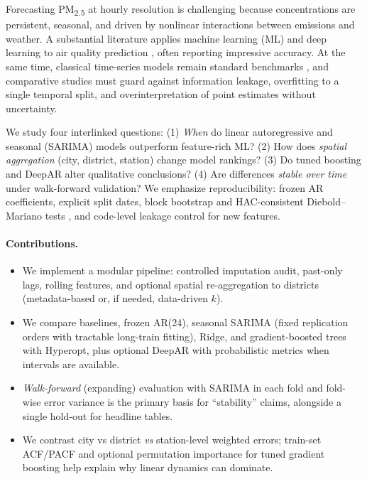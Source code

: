 \documentclass[11pt,a4paper]{article}
\begin{document}
Forecasting PM\textsubscript{2.5} at hourly resolution is challenging because concentrations are persistent, seasonal, and driven by nonlinear interactions between emissions and weather. A substantial literature applies machine learning (ML) and deep learning to air quality prediction \citep{shao2020predictions}, often reporting impressive accuracy. At the same time, classical time-series models remain standard benchmarks \citep{box2015time,hyndman2021forecasting}, and comparative studies must guard against information leakage, overfitting to a single temporal split, and overinterpretation of point estimates without uncertainty.

We study four interlinked questions: (1) \emph{When} do linear autoregressive and seasonal (SARIMA) models outperform feature-rich ML? (2) How does \emph{spatial aggregation} (city, district, station) change model rankings? (3) Do tuned boosting and DeepAR alter qualitative conclusions? (4) Are differences \emph{stable over time} under walk-forward validation? We emphasize reproducibility: frozen AR coefficients, explicit split dates, block bootstrap and HAC-consistent Diebold--Mariano tests \citep{diebold1995comparing,harvey1997testing}, and code-level leakage control for new features.

\paragraph{Contributions.}
\begin{itemize}
  \item We implement a modular pipeline: controlled imputation audit, past-only lags, rolling features, and optional spatial re-aggregation to districts (metadata-based or, if needed, data-driven $k$).
  \item We compare baselines, frozen AR(24), seasonal SARIMA (fixed replication orders with tractable long-train fitting), Ridge, and gradient-boosted trees with Hyperopt, plus optional DeepAR with probabilistic metrics when intervals are available.
  \item \emph{Walk-forward} (expanding) evaluation with SARIMA in each fold and fold-wise error variance is the primary basis for ``stability'' claims, alongside a single hold-out for headline tables.
  \item We contrast city vs district \emph{vs} station-level weighted errors; train-set ACF/PACF and optional permutation importance for tuned gradient boosting help explain why linear dynamics can dominate.
\end{itemize}
\end{document}
